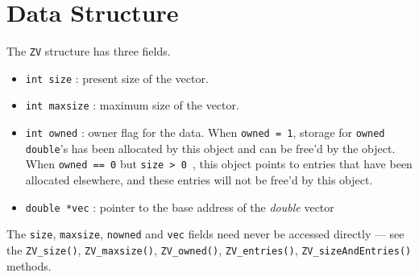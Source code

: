 \par
\section{Data Structure}
\label{section:ZV:dataStructure}
\par
\par
The {\tt ZV} structure has three fields.
\begin{itemize}
\item
{\tt int size} : present size of the vector.
\item
{\tt int maxsize} : maximum size of the vector.
\item
{\tt int owned} : owner flag for the data.
When {\tt owned = 1}, storage for {\tt owned} {\tt double}'s
has been allocated by this object and can be free'd by the object.
When {\tt owned == 0} but {\tt size > 0 }, this object points to
entries that have been allocated elsewhere, and these entries will
not be free'd by this object.
\item
{\tt double *vec} : 
pointer to the base address of the {\it double} vector
\end{itemize}
The {\tt size}, {\tt maxsize}, {\tt nowned} and {\tt vec} fields 
need never be accessed directly --- 
see the 
{\tt ZV\_size()},
{\tt ZV\_maxsize()},
{\tt ZV\_owned()},
{\tt ZV\_entries()},
{\tt ZV\_sizeAndEntries()} methods.
